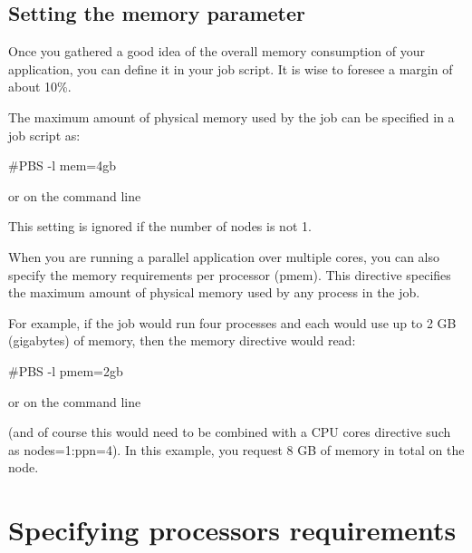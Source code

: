 \begin{prompt}
\end{prompt}

\subsection{Setting the memory parameter}

Once you gathered a good idea of the overall memory consumption of your
application, you can define it in your job script.  It is wise to foresee a
margin of about 10\%.


The maximum amount of physical memory used by the job can be specified in a job
script as:

\begin{prompt}
#PBS -l mem=4gb
\end{prompt}

or on the command line

\begin{prompt}
\end{prompt}

This setting is ignored if the number of nodes is not 1.


When you are running a parallel application over multiple cores, you can also
specify the memory requirements per processor (pmem). This directive specifies
the maximum amount of physical memory used by any process in the job.

For example, if the job would run four processes and each would use up to 2 GB
(gigabytes) of memory, then the memory directive would read:

\begin{prompt}
#PBS -l pmem=2gb
\end{prompt}

or on the command line

\begin{prompt}
\end{prompt}

(and of course this would need to be combined with a CPU cores directive such as nodes=1:ppn=4).
In this example, you request 8 GB of memory in total on the node.

\section{Specifying processors requirements}

